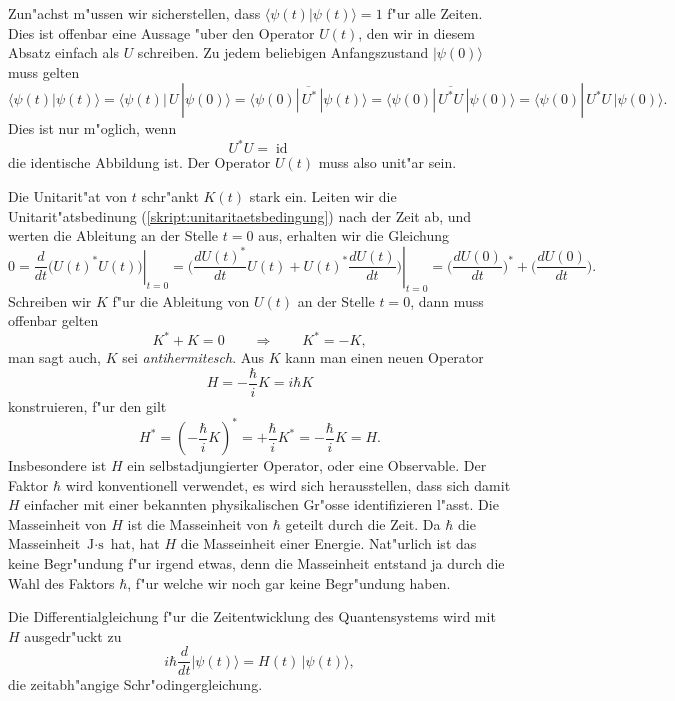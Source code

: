 Zun"achst m"ussen wir sicherstellen, dass $\langle\psi(t)|\psi(t)\rangle=1$
f"ur alle Zeiten. Dies ist offenbar eine Aussage "uber den Operator $U(t)$,
den wir in diesem Absatz einfach als $U$ schreiben.
Zu jedem beliebigen Anfangszustand $|\psi(0)\rangle$ muss gelten
\[
\langle \psi(t)|\psi(t)\rangle
=
\langle \psi(t)|\,U\,|\psi(0)\rangle
=
\overline{\langle\psi(0)|\,U^*\,|\psi(t)\rangle}
=
\overline{\langle\psi(0)|\,U^*U\,|\psi(0)\rangle}
=
\langle\psi(0)|\,U^*U\,|\psi(0)\rangle.
\]
Dies ist nur m"oglich, wenn
\begin{equation}
U^*U=\operatorname{id}
\label{skript:unitaritaetsbedingung}
\end{equation}
die identische Abbildung ist. Der Operator $U(t)$ muss also unit"ar sein.

Die Unitarit"at von $t$ schr"ankt $K(t)$ stark ein. Leiten wir die
Unitarit"atsbedinung (\ref{skript:unitaritaetsbedingung}) nach der Zeit ab,
und werten die Ableitung an der Stelle $t=0$ aus,
erhalten wir die Gleichung
\[
0
=
\left.\frac{d}{dt}\bigl(U(t)^*U(t)\bigr)\right|_{t=0}
=
\left.
\biggl(
\frac{dU(t)^*}{dt}U(t)+U(t)^*\frac{dU(t)}{dt}
\biggr)
\right|_{t=0}
=
\biggl(\frac{dU(0)}{dt}\biggr)^*
+
\biggl(\frac{dU(0)}{dt}\biggr).
\]
Schreiben wir $K$ f"ur die Ableitung von $U(t)$ an der Stelle $t=0$,
dann muss offenbar gelten
\[
K^*+K=0\qquad\Rightarrow\qquad K^*=-K,
\]
man sagt auch, $K$ sei {\em antihermitesch}. Aus $K$ kann man einen
neuen Operator
\[
H=-\frac{\hbar}{i}K=i\hbar K
\]
konstruieren, f"ur den gilt
\[
H^*
=
\left(-\frac{\hbar}{i}K\right)^*
=
+\frac{\hbar}{i}K^*
=
-\frac{\hbar}{i}K=H.
\]
Insbesondere ist $H$ ein selbstadjungierter Operator, oder
eine Observable.
Der Faktor $\hbar$ wird konventionell verwendet, es wird sich
herausstellen, dass sich damit $H$ einfacher mit einer bekannten
physikalischen Gr"osse identifizieren l"asst.
Die Masseinheit von $H$ ist die Masseinheit von $\hbar$ geteilt durch die Zeit.
Da $\hbar$ die Masseinheit $\text{J}\cdot\text{s}$ hat, hat
$H$ die Masseinheit einer Energie.
Nat"urlich ist das keine Begr"undung f"ur irgend etwas, denn die
Masseinheit entstand ja durch die Wahl des Faktors $\hbar$, f"ur
welche wir noch gar keine Begr"undung haben.

Die Differentialgleichung f"ur die Zeitentwicklung des Quantensystems wird
mit $H$ ausgedr"uckt zu
\begin{equation}
i\hbar\frac{d}{dt}|\psi(t)\rangle = H(t)\,|\psi(t)\rangle,
\label{skript:schroedingergleichungt}
\end{equation}
die {\rm zeitabh"angige Schr"odingergleichung}.

